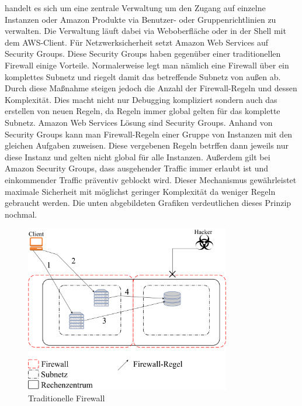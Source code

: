 \documentclass[titlepage]{report}
\begin{document}
handelt es sich um eine zentrale Verwaltung um den Zugang auf einzelne
Instanzen oder Amazon Produkte via Benutzer\hyp{} oder
Gruppenrichtlinien zu verwalten.\cite{iam} Die Verwaltung läuft
dabei via Weboberfläche oder in der Shell mit dem AWS\hyp{}Client.
Für Netzwerksicherheit setzt Amazon Web Services auf Security Groups.
Diese Security Groups haben gegenüber einer traditionellen Firewall
einige Vorteile. Normalerweise legt man nämlich eine Firewall über ein
komplettes Subnetz und riegelt damit das betreffende Subnetz von außen
ab. Durch diese Maßnahme steigen jedoch die Anzahl der
Firewall\hyp{}Regeln und dessen Komplexität. Dies macht nicht nur
Debugging kompliziert sondern auch das erstellen von neuen Regeln, da
Regeln immer global gelten für das komplette Subnetz. Amazon Web
Services Lösung sind Security Groups. Anhand von Security Groups kann
man Firewall\hyp{}Regeln einer Gruppe von Instanzen mit den gleichen
Aufgaben zuweisen. Diese vergebenen Regeln betrffen dann jeweils nur
diese Instanz und gelten nicht global für alle Instanzen. Außerdem gilt
bei Amazon Security Groups, dass ausgehender Traffic immer erlaubt ist
und einkommender Traffic präventiv geblockt wird. Dieser Mechanismus
gewährleistet maximale Sicherheit mit möglichst geringer Komplexität da
weniger Regeln gebraucht werden. Die unten abgebildeten Grafiken
verdeutlichen dieses Prinzip nochmal.
\begin{figure}[h]
      \centering
      \includegraphics[width=0.8\textwidth]{figures/traditional_firewall.pdf}
      \caption{Traditionelle Firewall}\label{fig:6}
\end{figure}
\end{document}
